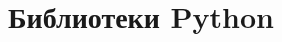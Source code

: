 \documentclass[12pt]{article}
\theoremstyle{remark}
\newtheorem{exercise}{}[subsection]
\begin{document}

\newpage

\appendix

\section{Библиотеки Python}
\end{document}
